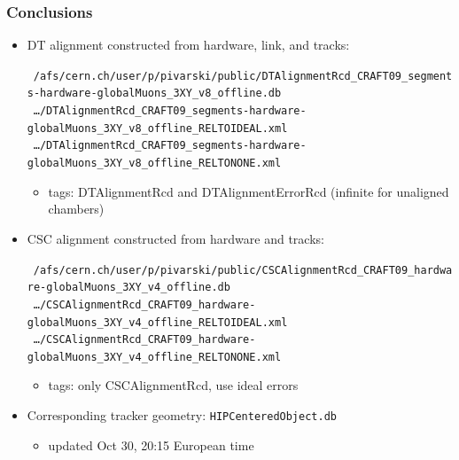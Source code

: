 \documentclass[compress]{beamer}
\begin{document}

\begin{frame}
\frametitle{Conclusions}
\begin{itemize}
\item DT alignment constructed from hardware, link, and tracks:

\mbox{\hspace{-1.25 cm} \tiny \tt /afs/cern.ch/user/p/pivarski/public/DTAlignmentRcd\_CRAFT09\_segments-hardware-globalMuons\_3XY\_v8\_offline.db}
\mbox{\hspace{-1.25 cm} \tiny \tt \ldots/DTAlignmentRcd\_CRAFT09\_segments-hardware-globalMuons\_3XY\_v8\_offline\_RELTOIDEAL.xml}
\mbox{\hspace{-1.25 cm} \tiny \tt \ldots/DTAlignmentRcd\_CRAFT09\_segments-hardware-globalMuons\_3XY\_v8\_offline\_RELTONONE.xml}

\begin{itemize}
\item tags: DTAlignmentRcd and DTAlignmentErrorRcd (infinite for unaligned chambers)
\end{itemize}

\item CSC alignment constructed from hardware and tracks:

\mbox{\hspace{-1.25 cm} \tiny \tt /afs/cern.ch/user/p/pivarski/public/CSCAlignmentRcd\_CRAFT09\_hardware-globalMuons\_3XY\_v4\_offline.db}
\mbox{\hspace{-1.25 cm} \tiny \tt \ldots/CSCAlignmentRcd\_CRAFT09\_hardware-globalMuons\_3XY\_v4\_offline\_RELTOIDEAL.xml}
\mbox{\hspace{-1.25 cm} \tiny \tt \ldots/CSCAlignmentRcd\_CRAFT09\_hardware-globalMuons\_3XY\_v4\_offline\_RELTONONE.xml}

\begin{itemize}
\item tags: only CSCAlignmentRcd, use ideal errors
\end{itemize}

\item Corresponding tracker geometry: {\tiny \tt HIPCenteredObject.db}

\begin{itemize}
\item updated Oct 30, 20:15 European time
\end{itemize}

\end{itemize}
\label{numpages}
\end{frame}
\end{document}
